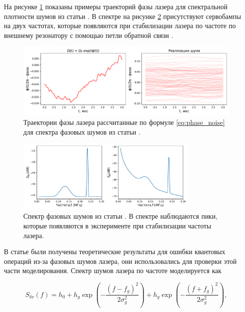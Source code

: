 На рисунке \ref{fig:noise_trajectories} показаны примеры траекторий фазы лазера для спектральной плотности шумов из статьи \cite{Saffman_Noise}. В спектре на рисунке \ref{fig:phase_spectrum} присутствуют сервобампы на двух частотах, которые появляются при стабилизации лазера по частоте по внешнему резонатору с помощью петли обратной связи \cite{PDH_Intro}. 

\begin{figure}[ht]
	\centering
	\includegraphics[width=1.0\textwidth]{images/phase_trajectories.pdf}
	\caption{Траектории фазы лазера рассчитанные по формуле \ref{eq:phase_noise} для спектра фазовых шумов из статьи \cite{Saffman_Noise}.}
	\label{fig:noise_trajectories}
\end{figure}

\begin{figure}[ht]
	\centering
	\includegraphics[width=0.8\textwidth]{images/phase_spectrum.pdf}
	\caption{Спектр фазовых шумов из статьи \cite{Saffman_Noise}. В спектре наблюдаются пики, которые появляются в эксперименте при стабилизации частоты лазера.}
	\label{fig:phase_spectrum}
\end{figure}

В статье \cite{Saffman_Noise} были получены теоретические результаты для ошибки квантовых операций из-за фазовых шумов лазера, они использовались для проверки этой части моделирования. Спектр шумов лазера по частоте моделируется как  

\begin{equation}
	S_{\delta\nu}(f) = h_0 + h_g \exp\left(-\frac{(f-f_g)^2}{2\sigma_g^2}\right) + h_g \exp\left(-\frac{(f+f_g)^2}{2\sigma_g^2}\right), 
\end{equation}

